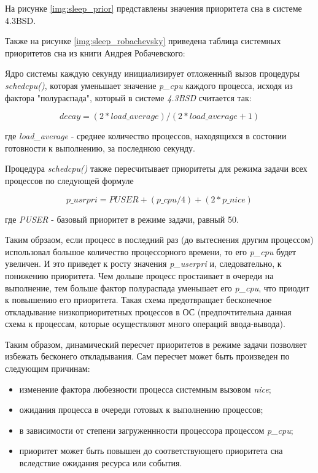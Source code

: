 На рисунке \ref{img:sleep_prior} представлены значения приоритета сна в системе 4.3BSD.


Также на рисунке \ref{img:sleep_robachevsky} приведена таблица системных приоритетов сна из книги Андрея Робачевского:


Ядро системы каждую секунду инициализирует отложенный вызов процедуры \textit{schedcpu()}, которая уменьшает значение \textit{p\_cpu} каждого процесса, исходя из фактора "полураспада", который в системе \textit{4.3BSD} считается так:

\begin{equation}
    decay = (2 * load\_average) / (2 * load\_average + 1)
\end{equation}

где \textit{load\_average} - среднее количество процессов, находящихся в состонии готовности к выполнению, за последнюю секунду.

Процедура \textit{schedcpu()} также пересчитывает приоритеты для режима задачи всех процессов по следующей формуле

\begin{equation}
    p\_usrpri = PUSER + (p\_cpu / 4) + (2 * p\_nice)
\end{equation}

где \textit{PUSER} - базовый приоритет в режиме задачи, равный 50.

Таким обрзаом, если процесс в последний раз (до вытеснения другим процессом) использовал большое количество процессорного времени, то его \textit{p\_cpu} будет увеличен. И это приведет к росту значения \textit{p\_userpri} и, следовательно, к понижению приоритета. Чем дольше процесс простаивает в очереди на выполнение, тем больше фактор полураспада уменьшает его \textit{p\_cpu}, что приодит к повышению его приоритета. Такая схема предотвращает бесконечное откладывание низкоприоритетных процессов в ОС (предпочтительна данная схема к процессам, которые осуществляют много операций ввода-вывода).

Таким образом, динамический пересчет приоритетов в режиме задачи  позволяет избежать бесконего откладывания. Сам пересчет может быть произведен по следующим причинам:

\begin{itemize}
    \item изменение фактора любезности процесса системным вызовом \textit{nice};
    \item ожидания процесса в очереди готовых к выполнению процессов;
    \item в зависимости от степени загруженнности процессора процессом \textit{p\_cpu};
    \item приоритет может быть повышен до соответствующего приоритета сна вследствие ожидания ресурса или события.
\end{itemize}




